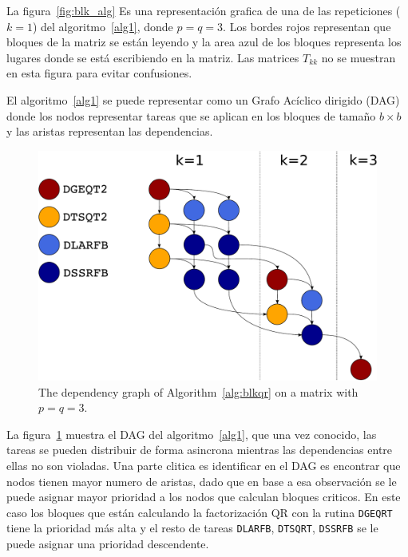 \documentclass[12pt]{article}
\begin{document}
\clearpage

La figura~\ref{fig:blk_alg} Es una representación grafica de una de las repeticiones ($k=1$) del algoritmo~\ref{alg1}, donde $p=q=3$. Los bordes rojos representan que bloques de la matriz se están leyendo y la area azul de los bloques representa los lugares donde se está escribiendo en la matriz. Las matrices $T_{kk}$ no se muestran en esta figura para evitar confusiones. 

El algoritmo~\ref{alg1} se puede representar como un Grafo Acíclico dirigido (DAG) donde los nodos representar tareas que se aplican en los bloques de tamaño $b \times b$ y las aristas representan las dependencias. 

\begin{figure}[!h]
  \begin{center}
    \includegraphics[width=\textwidth]{images/qr_dag_3x3_color.pdf}
  \caption{\label{fig:qr_dag}The dependency graph of
    Algorithm~\ref{alg:blkqr} on a matrix with $p=q=3$.}
  \end{center}
\end{figure}


La figura~\ref{fig:qr_dag} muestra el DAG del algoritmo~\ref{alg1}, que una vez conocido, las tareas se pueden distribuir de forma asincrona mientras las dependencias entre ellas no son violadas. Una parte clitica es identificar en el DAG es encontrar que nodos tienen mayor numero de aristas, dado que en base a esa observación se le puede asignar mayor prioridad a los nodos que calculan bloques criticos. En este caso los bloques que están calculando la factorización QR con la rutina \texttt{DGEQRT} tiene la prioridad más alta y el resto de tareas \texttt{DLARFB}, \texttt{DTSQRT}, \texttt{DSSRFB} se le puede asignar una prioridad descendente.
\end{document}
